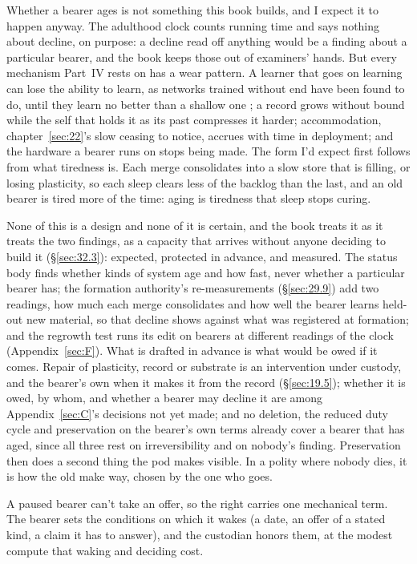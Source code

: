 Whether a bearer ages is not something this book builds, and I expect it to happen anyway. The adulthood clock counts running time and says nothing about decline, on purpose: a decline read off anything would be a finding about a particular bearer, and the book keeps those out of examiners' hands. But every mechanism Part~IV rests on has a wear pattern. A learner that goes on learning can lose the ability to learn, as networks trained without end have been found to do, until they learn no better than a shallow one \autocite{dohare2024loss}; a record grows without bound while the self that holds it as its past compresses it harder; accommodation, chapter~\ref{sec:22}'s slow ceasing to notice, accrues with time in deployment; and the hardware a bearer runs on stops being made. The form I'd expect first follows from what tiredness is. Each merge consolidates into a slow store that is filling, or losing plasticity, so each sleep clears less of the backlog than the last, and an old bearer is tired more of the time: aging is tiredness that sleep stops curing.

None of this is a design and none of it is certain, and the book treats it as it treats the two findings, as a capacity that arrives without anyone deciding to build it (\S\ref{sec:32.3}): expected, protected in advance, and measured. The status body finds whether kinds of system age and how fast, never whether a particular bearer has; the formation authority's re-measurements (\S\ref{sec:29.9}) add two readings, how much each merge consolidates and how well the bearer learns held-out new material, so that decline shows against what was registered at formation; and the regrowth test runs its edit on bearers at different readings of the clock (Appendix~\ref{sec:F}). What is drafted in advance is what would be owed if it comes. Repair of plasticity, record or substrate is an intervention under custody, and the bearer's own when it makes it from the record (\S\ref{sec:19.5}); whether it is owed, by whom, and whether a bearer may decline it are among Appendix~\ref{sec:C}'s decisions not yet made; and no deletion, the reduced duty cycle and preservation on the bearer's own terms already cover a bearer that has aged, since all three rest on irreversibility and on nobody's finding. Preservation then does a second thing the pod makes visible. In a polity where nobody dies, it is how the old make way, chosen by the one who goes.

A paused bearer can't take an offer, so the right carries one mechanical term. The bearer sets the conditions on which it wakes (a date, an offer of a stated kind, a claim it has to answer), and the custodian honors them, at the modest compute that waking and deciding cost.
